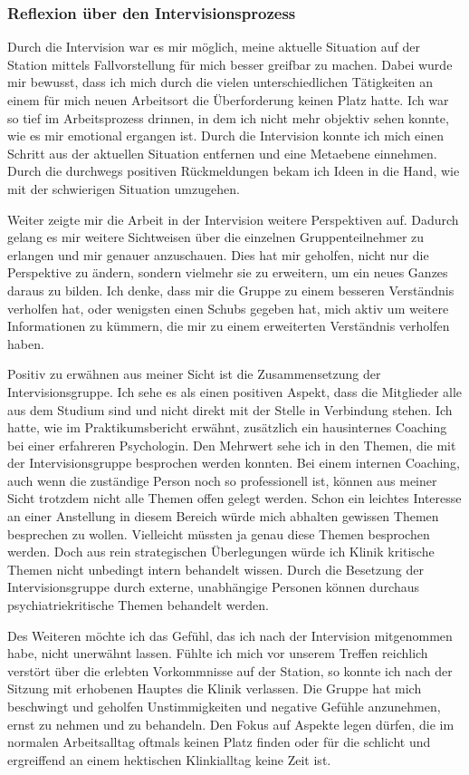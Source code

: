 \subsubsection{Reflexion über den Intervisionsprozess}
Durch die Intervision war es mir möglich, meine aktuelle Situation auf der Station mittels Fallvorstellung für mich besser greifbar zu machen. Dabei wurde mir bewusst, dass ich mich durch die vielen unterschiedlichen Tätigkeiten an einem für mich neuen Arbeitsort die Überforderung keinen Platz hatte. Ich war so tief im Arbeitsprozess drinnen, in dem ich nicht mehr objektiv sehen konnte, wie es mir emotional ergangen ist. Durch die Intervision konnte ich mich einen Schritt aus der aktuellen Situation entfernen und eine Metaebene einnehmen. Durch die durchwegs positiven Rückmeldungen bekam ich Ideen in die Hand, wie mit der schwierigen Situation umzugehen. 

Weiter zeigte mir die Arbeit in der Intervision weitere Perspektiven auf. Dadurch gelang es mir weitere Sichtweisen über die einzelnen Gruppenteilnehmer zu erlangen und mir genauer anzuschauen. Dies hat mir geholfen, nicht nur die Perspektive zu ändern, sondern vielmehr sie zu erweitern, um ein neues Ganzes daraus zu bilden. Ich denke, dass mir die Gruppe zu einem besseren Verständnis verholfen hat, oder wenigsten einen Schubs gegeben hat, mich aktiv um weitere Informationen zu kümmern, die mir zu einem erweiterten Verständnis verholfen haben.

Positiv zu erwähnen aus meiner Sicht ist die Zusammensetzung der Intervisionsgruppe. Ich sehe es als einen positiven Aspekt, dass die Mitglieder alle aus dem Studium sind und nicht direkt mit der Stelle in Verbindung stehen. Ich hatte, wie im Praktikumsbericht erwähnt, zusätzlich ein hausinternes Coaching bei einer erfahreren Psychologin. Den Mehrwert sehe ich in den Themen, die mit der Intervisionsgruppe besprochen werden konnten. Bei einem internen Coaching, auch wenn die zuständige Person noch so professionell ist, können aus meiner Sicht trotzdem nicht alle Themen offen gelegt werden. Schon ein leichtes Interesse an einer Anstellung in diesem Bereich würde mich abhalten gewissen Themen besprechen zu wollen. Vielleicht müssten ja genau diese Themen besprochen werden. Doch aus rein strategischen Überlegungen würde ich Klinik kritische Themen nicht unbedingt intern behandelt wissen. Durch die Besetzung der Intervisionsgruppe durch externe, unabhängige Personen können durchaus psychiatriekritische Themen behandelt werden.

Des Weiteren möchte ich das Gefühl, das ich nach der Intervision mitgenommen habe, nicht unerwähnt lassen. Fühlte ich mich vor unserem Treffen reichlich verstört über die erlebten Vorkommnisse auf der Station, so konnte ich nach der Sitzung mit erhobenen Hauptes die Klinik verlassen. Die Gruppe hat mich beschwingt und geholfen Unstimmigkeiten und negative Gefühle anzunehmen, ernst zu nehmen und zu behandeln. Den Fokus auf Aspekte legen dürfen, die im normalen Arbeitsalltag oftmals keinen Platz finden oder für die schlicht und ergreiffend an einem hektischen Klinkialltag keine Zeit ist. 

